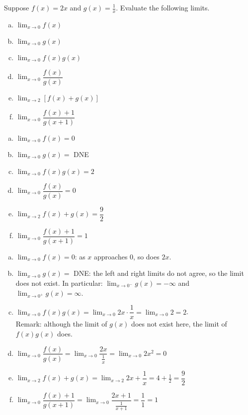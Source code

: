 \begin{Mquestion}Suppose $f(x)=2x$ and $g(x)=\frac{1}{x}$. Evaluate the following limits.\begin{enumerate}[(a)]
\item $\displaystyle\lim_{x \rightarrow 0} f(x)$
\item $\displaystyle\lim_{x \rightarrow 0} g(x)$
\item $\displaystyle\lim_{x \rightarrow 0} f(x)g(x)$
\item $\displaystyle\lim_{x \rightarrow 0} \dfrac{f(x)}{g(x)}$
\item $\displaystyle\lim_{x \rightarrow 2} [f(x)+g(x)]$
\item $\displaystyle\lim_{x \rightarrow 0} \dfrac{f(x)+1}{g(x+1)}$
\end{enumerate}
\end{Mquestion}
\begin{answer}
\begin{enumerate}[(a)]
\item $\displaystyle\lim_{x \rightarrow 0} f(x)=0$
\item $\displaystyle\lim_{x \rightarrow 0} g(x)=$ DNE
\item $\displaystyle\lim_{x \rightarrow 0} f(x)g(x)=2$
\item $\displaystyle\lim_{x \rightarrow 0} \dfrac{f(x)}{g(x)}=0$
\item $\displaystyle\lim_{x \rightarrow 2} f(x)+g(x)=\dfrac{9}{2}$
\item $\displaystyle\lim_{x \rightarrow 0} \dfrac{f(x)+1}{g(x+1)}=1$
\end{enumerate}
\end{answer}
\begin{solution}
\begin{enumerate}[(a)]
\item $\displaystyle\lim_{x \rightarrow 0} f(x)=0$: as $x$ approaches 0, so does $2x$.
\item $\displaystyle\lim_{x \rightarrow 0} g(x)=$ DNE: the left and right limits do not agree, so the limit does not exist. In particular: $\displaystyle\lim_{x \rightarrow 0^-} g(x)=-\infty$ and $\displaystyle\lim_{x \rightarrow 0^+} g(x)=\infty$.
\item $\displaystyle\lim_{x \rightarrow 0} f(x)g(x)=\displaystyle\lim_{x \rightarrow 0} 2x\cdot\dfrac{1}{x}=\displaystyle\lim_{x \rightarrow 0} 2=2$. \\
Remark:  although the limit of $g(x)$ does not exist here, the limit of $f(x)g(x)$ does.
\item $\displaystyle\lim_{x \rightarrow 0} \dfrac{f(x)}{g(x)}=\displaystyle\lim_{x \rightarrow 0} \dfrac{2x}{\frac{1}{x}}=\displaystyle\lim_{x \rightarrow 0} 2x^2=0$
\item $\displaystyle\lim_{x \rightarrow 2} f(x)+g(x)=\displaystyle\lim_{x \rightarrow 2} 2x+\dfrac{1}{x}=4+\frac{1}{2}=\dfrac{9}{2}$
\item $\displaystyle\lim_{x \rightarrow 0} \dfrac{f(x)+1}{g(x+1)}=
\displaystyle\lim_{x \rightarrow 0} \dfrac{2x+1}{\frac{1}{x+1}}=\dfrac{1}{1}=
1$
\end{enumerate}
\end{solution}

